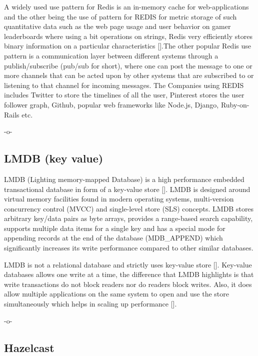 A widely used use pattern for Redis is an in-memory cache for
web-applications and the other being the use of pattern for REDIS for
metric storage of such quantitative data such as the web page usage
and user behavior on gamer leaderboards where using a bit operations
on strings, Redis very efficiently stores binary information on a
particular characteristics [\cite{redis-book-2016}].The other popular
Redis use pattern is a communication layer between different systems
through a publish/subscribe (pub/sub for short), where one can post
the message to one or more channels that can be acted upon by other
systems that are subscribed to or listening to that channel for
incoming messages. The Companies using REDIS includes Twitter to store
the timelines of all the user, Pinterest stores the user follower
graph, Github, popular web frameworks like Node.js, Django,
Ruby-on-Rails etc.

     -o-

\subsection{LMDB (key value)}

LMDB (Lighting memory-mapped Database) is a high performance embedded
transactional database in form of a key-value
store [\cite{www-keyvalue}]. LMDB is designed around virtual memory
facilities found in modern operating systems, multi-version
concurrency control (MVCC) and single-level store (SLS) concepts. LMDB
stores arbitrary key/data pairs as byte arrays, provides a range-based
search capability, supports multiple data items for a single key and
has a special mode for appending records at the end of the database
(MDB\_APPEND) which significantly increases its write performance
compared to other similar databases.

LMDB is not a relational database and strictly uses key-value
store [\cite{www-relationaldb}].  Key-value databases allows one write
at a time, the difference that LMDB highlights is that write
transactions do not block readers nor do readers block writes. Also,
it does allow multiple applications on the same system to open and use
the store simultaneously which helps in scaling up
performance [\cite{www-lmdb}].

     -o-

\subsection{Hazelcast}

